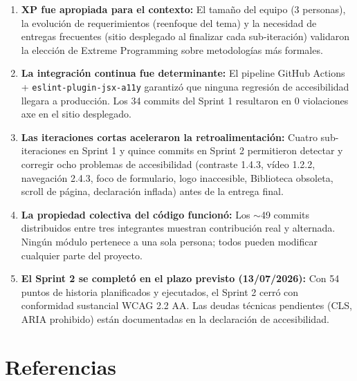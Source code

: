 \documentclass[12pt, a4paper]{article}
\begin{document}
\begin{enumerate}
  \item \textbf{XP fue apropiada para el contexto:} El tamaño del equipo (3 personas), la evolución de requerimientos (reenfoque del tema) y la necesidad de entregas frecuentes (sitio desplegado al finalizar cada sub-iteración) validaron la elección de Extreme Programming sobre metodologías más formales.

  \item \textbf{La integración continua fue determinante:} El pipeline GitHub Actions + \texttt{eslint-plugin-jsx-a11y} garantizó que ninguna regresión de accesibilidad llegara a producción. Los 34 commits del Sprint 1 resultaron en 0 violaciones axe en el sitio desplegado.

  \item \textbf{Las iteraciones cortas aceleraron la retroalimentación:} Cuatro sub-iteraciones en Sprint 1 y quince commits en Sprint 2 permitieron detectar y corregir ocho problemas de accesibilidad (contraste 1.4.3, vídeo 1.2.2, navegación 2.4.3, foco de formulario, logo inaccesible, Biblioteca obsoleta, scroll de página, declaración inflada) antes de la entrega final.

  \item \textbf{La propiedad colectiva del código funcionó:} Los $\sim$49 commits distribuidos entre tres integrantes muestran contribución real y alternada. Ningún módulo pertenece a una sola persona; todos pueden modificar cualquier parte del proyecto.

  \item \textbf{El Sprint 2 se completó en el plazo previsto (13/07/2026):} Con 54 puntos de historia planificados y ejecutados, el Sprint 2 cerró con conformidad sustancial WCAG 2.2 AA. Las deudas técnicas pendientes (CLS, ARIA prohibido) están documentadas en la declaración de accesibilidad.
\end{enumerate}

\section*{Referencias}
\end{document}
